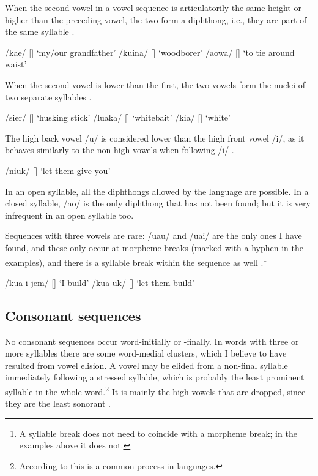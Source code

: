When the second vowel in a vowel sequence is articulatorily the same height or higher than the preceding vowel, the two form a diphthong, i.e., they are part of the same syllable .

\ea
\label{ex:2:twovowel1}
\ea
/kae/  []  `my/our grandfather'
\ex
/kuina/  []  `woodborer'
\ex
/aowa/  []  `to tie around waist'
\z
\z


When the second vowel is lower than the first, the two vowels form the nuclei of two separate syllables . 

\ea
\label{ex:2:twovowel2}
\ea
/sier/  []  `husking stick'
\ex
/luaka/  []  `whitebait'
\ex
/kia/  []  `white'
\z
\z


The high back vowel /u/ is considered lower than the high front vowel /i/, as it behaves similarly to the non-high vowels when following /i/ .

\ea
\label{ex:2:twovowel3}
/niuk/  []  `let them give you'
\z

In an open syllable, all the diphthongs allowed by the language are possible. In a closed syllable, /ao/ is the only diphthong that has not been found; but it is very infrequent in an open syllable too. 

Sequences with three vowels are rare: /uau/ and /uai/ are the only ones I have found, and these only occur at morpheme breaks (marked with a hyphen in the examples), and there is a syllable break within the sequence as well .\footnote{A syllable break does not need to coincide with a morpheme break; in the examples above it does not.}  

\ea \label{ex:2:threevowels}
\ea
/kua-i-jem/    []      `I build'
\ex
/kua-uk/      []      `let them build'
\z
\z

\subsection{Consonant sequences} \label{sec:2.2.3}

No consonant sequences occur word-initially or -finally. In words with three or more syllables there are some word-medial clusters, which I believe to have resulted from vowel elision.  A vowel may be elided from a non-final syllable immediately following a stressed syllable, which is probably the least prominent syllable in the whole word.\footnote{According to \citet[11]{Sommerstein1977} this is a common process in languages.} It is mainly the high vowels that are dropped, since they are the least sonorant . 


